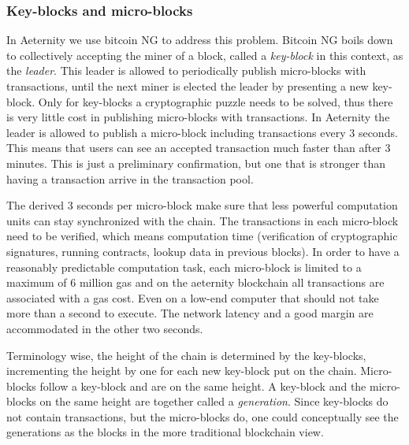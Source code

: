 \subsubsection{Key-blocks and micro-blocks}

In Aeternity we use bitcoin NG \cite{Eyal:2016:BSB:2930611.2930615} to
address this problem. Bitcoin NG boils down to collectively accepting the miner of a
block, called a \textit{key-block} in this context, as the
\textit{leader}. This leader is allowed to periodically publish micro-blocks with
transactions, until the next miner is elected the leader by presenting a
new key-block. Only for key-blocks a cryptographic puzzle needs to be
solved, thus there is very little cost in publishing micro-blocks with
transactions. In Aeternity the leader is allowed to publish a
micro-block including transactions every 3 seconds. This means that
users can see an accepted transaction much faster than after 3
minutes. This is just a preliminary confirmation, but one that is
stronger than having a transaction arrive in the transaction pool.

The derived 3 seconds per micro-block make sure that less powerful
computation units can stay synchronized with the chain. The
transactions in each micro-block need to be verified, which means
computation time (verification of cryptographic signatures, running
contracts, lookup data in previous blocks). In order to have a
reasonably predictable computation task, each micro-block is limited to
a maximum of 6 million gas and on the aeternity blockchain all
transactions are associated with a gas cost. Even on a low-end computer that should
not take more than a second to execute. The network latency and a good margin
are accommodated in the other two seconds.

Terminology wise, the height of the chain is determined by the
key-blocks, incrementing the height by one for each new key-block put
on the chain. Micro-blocks follow a key-block and are on the same
height. A key-block and the micro-blocks on the same height are
together called a \textit{generation}. Since key-blocks do not contain
transactions, but the micro-blocks do, one could conceptually see the
generations as the blocks in the more traditional blockchain view.

